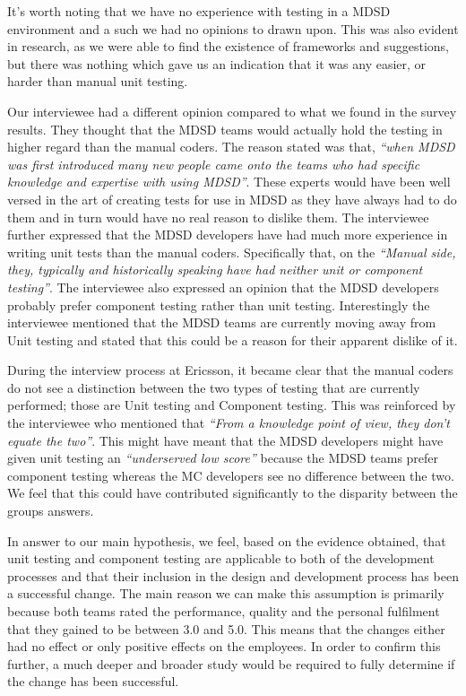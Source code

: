 \documentclass[final_report_innit.tex]{subfiles}
\begin{document}
It's worth noting that we have no experience with testing in a MDSD environment and a such we had no opinions to drawn upon. This was also evident in research, as we were able to find the existence of frameworks and suggestions, but there was nothing which gave us an indication that it was any easier, or harder than manual unit testing.

Our interviewee had a different opinion compared to what we found in the survey results. They thought that the MDSD teams would actually hold the testing in higher regard than the manual coders. The reason stated was that, \textit{``when MDSD was first introduced many new people came onto the teams who had specific knowledge and expertise with using MDSD''}. These experts would have been well versed in the art of creating tests for use in MDSD as they have always had to do them and in turn would have no real reason to dislike them. The interviewee further expressed that the MDSD developers have had much more experience in writing unit tests than the manual coders. Specifically that, on the \textit{``Manual side, they, typically and historically speaking have had neither unit or component testing''}.
The interviewee also expressed an opinion that the MDSD developers probably prefer component testing rather than unit testing. Interestingly the interviewee mentioned that the MDSD teams are currently moving away from Unit testing and stated that this could be a reason for their apparent dislike of it.

During the interview process at Ericsson, it became clear that the manual coders do not see a distinction between the two types of
testing that are currently performed; those are Unit testing and Component testing. This was reinforced by the interviewee who mentioned that \textit{``From a knowledge point of view, they don't equate the two''}. This might have meant that the MDSD developers might have given unit testing an \textit{``underserved low score''} because the MDSD teams prefer component testing whereas the MC developers see no difference between the two. We feel that this could have contributed significantly to the disparity between the groups answers.

In answer to our main hypothesis, we feel, based on the evidence obtained, that unit testing and component testing are applicable to both of the development processes and that their inclusion in the design and development process has been a successful change. The main reason we can make this assumption is primarily because both teams rated the performance, quality and the personal fulfilment that they gained to be between 3.0 and 5.0. This means that the changes either had no effect or only positive effects on the employees. In order to confirm this further, a much deeper and broader study would be required to fully determine if the change has been successful.
\end{document}
